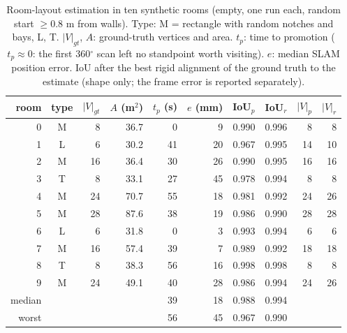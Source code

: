\begin{table}[t]
\centering
\caption{Room-layout estimation in ten synthetic rooms (empty, one run each, random start $\geq$0.8 m from walls). Type: M = rectangle with random notches and bays, L, T. $|V|_{gt}$, $A$: ground-truth vertices and area. $t_p$: time to promotion ($t_p\approx0$: the first 360$^\circ$ scan left no standpoint worth visiting). $e$: median SLAM position error. IoU after the best rigid alignment of the ground truth to the estimate (shape only; the frame error is reported separately).}
\label{tab:estimation-synthetic}
\begin{tabular}{r c r r r r r r r r}
\toprule
room & type & $|V|_{gt}$ & $A$ (m$^2$) & $t_p$ (s) & $e$ (mm) & IoU$_p$ & IoU$_r$ & $|V|_p$ & $|V|_r$ \\
\midrule
0 & M & 8 & 36.7 & 0 & 9 & 0.990 & 0.996 & 8 & 8 \\
1 & L & 6 & 30.2 & 41 & 20 & 0.967 & 0.995 & 14 & 10 \\
2 & M & 16 & 36.4 & 30 & 26 & 0.990 & 0.995 & 16 & 16 \\
3 & T & 8 & 33.1 & 27 & 45 & 0.978 & 0.994 & 8 & 8 \\
4 & M & 24 & 70.7 & 55 & 18 & 0.981 & 0.992 & 24 & 26 \\
5 & M & 28 & 87.6 & 38 & 19 & 0.986 & 0.990 & 28 & 28 \\
6 & L & 6 & 31.8 & 0 & 3 & 0.993 & 0.994 & 6 & 6 \\
7 & M & 16 & 57.4 & 39 & 7 & 0.989 & 0.992 & 18 & 18 \\
8 & T & 8 & 38.3 & 56 & 16 & 0.998 & 0.998 & 8 & 8 \\
9 & M & 24 & 49.1 & 40 & 28 & 0.986 & 0.994 & 24 & 26 \\
\midrule
median & & & & 39 & 18 & 0.988 & 0.994 & & \\
worst & & & & 56 & 45 & 0.967 & 0.990 & & \\
\bottomrule
\end{tabular}
\end{table}
